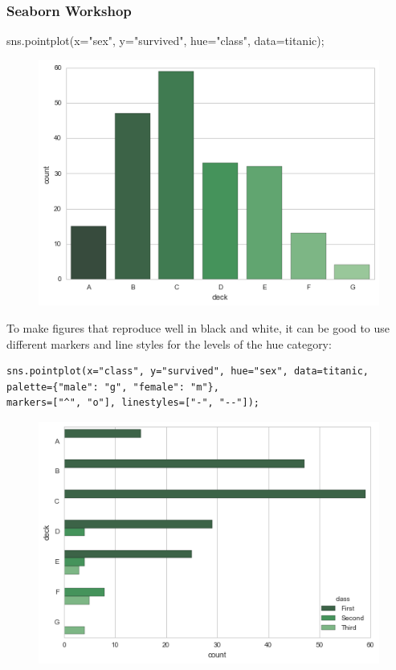 \documentclass{beamer}
\begin{document}
\begin{frame}[fragile]
	\frametitle{Seaborn Workshop}
sns.pointplot(x="sex", y="survived", hue="class", data=titanic);
\begin{figure}
\centering
\includegraphics[width=0.7\linewidth]{images/categorical_35_0}
\caption{}
\label{fig:categorical_35_0}
\end{figure}
\end{frame}
\begin{frame}[fragile]
To make figures that reproduce well in black and white, it can be good to use different markers and line styles for the levels of the hue category:
\begin{verbatim}
sns.pointplot(x="class", y="survived", hue="sex", data=titanic,
palette={"male": "g", "female": "m"},
markers=["^", "o"], linestyles=["-", "--"]);
\end{verbatim}

\begin{figure}
\centering
\includegraphics[width=0.7\linewidth]{images/categorical_37_0}
\caption{}
\label{fig:categorical_37_0}
\end{figure}

\end{frame}
\end{document}

